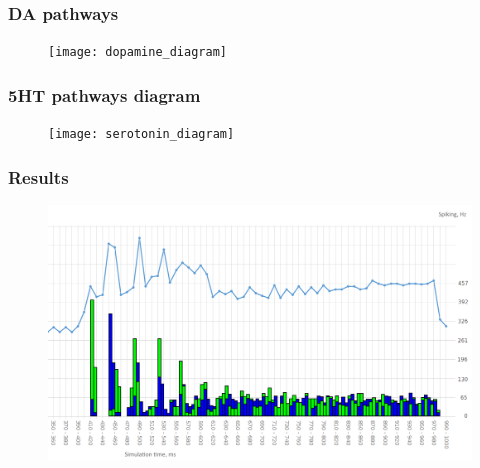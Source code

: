 \documentclass[12pt, aspectratio=169]{beamer}
\begin{document}

\begin{frame}
\frametitle{DA pathways}
\begin{figure}
\texttt{[image: dopamine\_diagram]}
\end{figure}
\end{frame}


\begin{frame}
\frametitle{5HT pathways diagram}
\begin{figure}
\texttt{[image: serotonin\_diagram]}
\end{figure}
\end{frame}



\begin{frame}
\frametitle{Results}
\begin{figure}
\includegraphics[width=0.8\linewidth]{resultBIG_short}
\end{figure}
\end{frame}


\end{document}
